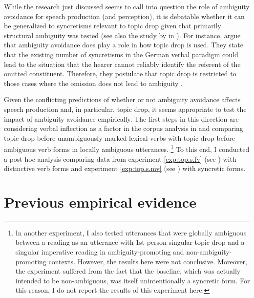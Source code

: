 While the research just discussed seems to call into question the role of ambiguity avoidance for speech production  (and perception), it is debatable whether it can be generalized to syncretisms  relevant to topic drop given that primarily structural ambiguity was tested (see also the study by \cite{soares.etal2019} in ).
For instance, \citet{volodina.onea2012} argue that ambiguity avoidance does play a role in how topic drop is used.
They state that the existing number of syncretisms  in the German verbal paradigm could lead to the situation that the hearer cannot reliably identify the referent of the omitted constituent.
Therefore, they postulate that topic drop is restricted to those cases where the omission does not lead to ambiguity \citep[214--215]{volodina.onea2012}.


Given the conflicting predictions of whether or not ambiguity avoidance affects speech production and, in particular, topic drop, it seems appropriate to test the impact of ambiguity avoidance empirically.
The first steps in this direction are considering verbal inflection as a factor in the corpus analysis in  and comparing topic drop before unambiguously marked lexical verbs  with topic drop before ambiguous verb forms in locally ambiguous utterances.%
\footnote{\label{note:ambiguity}In another experiment, I also tested utterances that were globally ambiguous between a reading as an utterance with 1st person singular topic drop and a singular imperative  reading in ambiguity-promoting and non-ambiguity-promoting contexts.
However, the results here were not conclusive.
Moreover, the experiment suffered from the fact that the baseline, which was actually intended to be non-ambiguous, was itself unintentionally a syncretic form.
For this reason, I do not report the results of this experiment here.
}
%
To this end, I conducted a post hoc analysis comparing data from experiment \ref*{exp:top.s.fv} (see ) with distinctive verb forms and experiment \ref*{exp:top.s.mv} (see ) with syncretic forms.  

\section{Previous empirical evidence}
